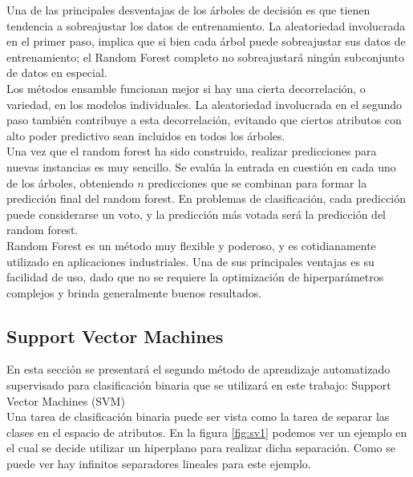 Una de las principales desventajas de los árboles de decisión es que tienen tendencia a sobreajustar los datos de entrenamiento. La aleatoriedad involucrada en el primer paso, implica que si bien cada árbol puede sobreajustar sus datos de entrenamiento; el Random Forest completo no sobreajustará ningún subconjunto de datos en especial. \\

Los métodos ensamble funcionan mejor si hay una cierta decorrelación, o variedad, en los modelos individuales. La aleatoriedad involucrada en el segundo paso también contribuye a esta decorrelación, evitando que ciertos atributos con alto poder predictivo sean incluidos en todos los árboles. \\

Una vez que el random forest ha sido construido, realizar predicciones para nuevas instancias es muy sencillo. Se evalúa la entrada en cuestión en cada uno de los árboles, obteniendo $n$ predicciones que se combinan para formar la predicción final del random forest. En problemas de clasificación, cada predicción puede considerarse un voto, y la predicción más votada será la predicción del random forest.\\

Random Forest es un método muy flexible y poderoso, y es cotidianamente utilizado en aplicaciones industriales. Una de sus principales ventajas es su facilidad de uso, dado que no se requiere la optimización de hiperparámetros complejos y brinda generalmente buenos resultados.

\subsection{Support Vector Machines}

\label{trick}

En esta sección se presentará el segundo método de aprendizaje automatizado supervisado para clasificación binaria que se utilizará en este trabajo: Support Vector Machines (SVM) \cite{svm2} \cite{svm}  \\

Una tarea de clasificación binaria puede ser vista como la tarea de separar las clases en el espacio de atributos. En la figura \ref{fig:sv1} podemos ver un ejemplo en el cual se decide utilizar un hiperplano para realizar dicha separación. Como se puede ver hay infinitos separadores lineales para este ejemplo. \\


